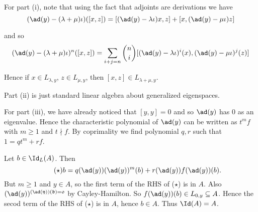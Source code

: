For part (i), note that using the fact that adjoints are
derivations we have
\[ (\ad(y) - (\lambda+\mu)\iota)([x, z]) = [(\ad(y) - \lambda\iota)x, z] +
		[x, (\ad(y)-\mu\iota)z] \]

and so
\[ (\ad(y) - (\lambda + \mu)\iota)^n([x, z]) = \sum_{i + j = n}\binom{n}{i}[(\ad(y) - \lambda\iota)^i(x), (\ad(y) - \mu\iota)^j(z)] \]

Hence if $x \in L_{\lambda, y}$, $z \in L_{\mu, y}$, then
$[x, z] \in L_{\lambda + \mu, y}$.

Part (ii) is just standard linear algebra about generalized eigenspaces.

For part (iii), we have already noticed that $[y, y] = 0$ and so $\ad(y)$
has $0$ as an eigenvalue. Hence the characteristic polynomial of $\ad(y)$ can
be written as $t^mf$ with $m\geq 1$ and $t\nmid f$. By coprimality we find
polynomial $q, r$ such that $1 = qt^m + rf$.

Let $b \in \Id_L(A)$. Then
\begin{equation*}\tag{$\star$}
b = q(\ad(y))(\ad(y))^m(b) + r(\ad(y))f(\ad(y))(b).
\end{equation*}
But $m\geq 1$ and $y \in A$, so the first term of the RHS of ($\star$) is in $A$.
Also $(\ad(y))^\mathfrak{(\ad(y))(b) = 0}$ by Cayley-Hamilton. So
$f(\ad(y))(b) \in L_{0, y} \subseteq A$. Hence the secod term of the RHS of
($\star$) is in $A$, hence $b \in A$. Thus $\Id(A) = A$.
